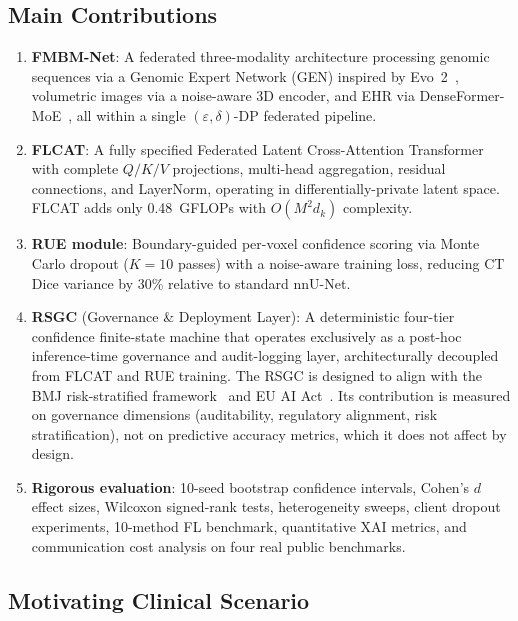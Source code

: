 \documentclass{ieeeaccess}
\begin{document}
\subsection*{Main Contributions}
\begin{enumerate}
\item \textbf{FMBM-Net}: A federated three-modality architecture processing
  genomic sequences via a Genomic Expert Network (GEN) inspired by
  Evo~2~\cite{evo2_2026}, volumetric images via a noise-aware 3D encoder,
  and EHR via DenseFormer-MoE~\cite{denseformer2024}, all within a single
  $(\varepsilon,\delta)$-DP federated pipeline.

\item \textbf{FLCAT}: A fully specified Federated Latent Cross-Attention
  Transformer with complete $Q/K/V$ projections, multi-head aggregation,
  residual connections, and LayerNorm, operating in differentially-private
  latent space. FLCAT adds only 0.48~GFLOPs with $O(M^2 d_k)$ complexity.

\item \textbf{RUE module}: Boundary-guided per-voxel confidence scoring via
  Monte Carlo dropout ($K\!=\!10$ passes) with a noise-aware training loss,
  reducing CT Dice variance by 30\% relative to standard nnU-Net.

\item \textbf{RSGC} (Governance \& Deployment Layer): A deterministic
  four-tier confidence finite-state machine that operates exclusively as a
  post-hoc inference-time governance and audit-logging layer, architecturally
  decoupled from FLCAT and RUE training. The RSGC is designed to align with
  the BMJ risk-stratified framework~\cite{bmj_governance_2026} and EU AI
  Act~\cite{eu_ai_act_2024}. Its contribution is measured on governance
  dimensions (auditability, regulatory alignment, risk stratification),
  not on predictive accuracy metrics, which it does not affect by design.

\item \textbf{Rigorous evaluation}: 10-seed bootstrap confidence intervals,
  Cohen's $d$ effect sizes, Wilcoxon signed-rank tests, heterogeneity sweeps,
  client dropout experiments, 10-method FL benchmark, quantitative XAI
  metrics, and communication cost analysis on four real public benchmarks.
\end{enumerate}

\subsection{Motivating Clinical Scenario}
\end{document}
